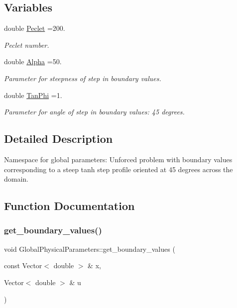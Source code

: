 \subsection*{Variables}
\begin{DoxyCompactItemize}
\item 
double \hyperlink{namespaceGlobalPhysicalParameters_ab7011a8f93f2cbd3d45af00151aee3b2}{Peclet} =200.
\begin{DoxyCompactList}\small\item\em Peclet number. \end{DoxyCompactList}\item 
double \hyperlink{namespaceGlobalPhysicalParameters_aec7a344b74b10d835b331ef0dc6601da}{Alpha} =50.
\begin{DoxyCompactList}\small\item\em Parameter for steepness of step in boundary values. \end{DoxyCompactList}\item 
double \hyperlink{namespaceGlobalPhysicalParameters_af9a5a947d725f1f088db6a6423f2f3ef}{Tan\+Phi} =1.
\begin{DoxyCompactList}\small\item\em Parameter for angle of step in boundary values\+: 45 degrees. \end{DoxyCompactList}\end{DoxyCompactItemize}


\subsection{Detailed Description}
Namespace for global parameters\+: Unforced problem with boundary values corresponding to a steep tanh step profile oriented at 45 degrees across the domain. 

\subsection{Function Documentation}
\mbox{\label{namespaceGlobalPhysicalParameters_a6e1db5726436a705e9d400fedf914cef}} 
\subsubsection{\texorpdfstring{get\+\_\+boundary\+\_\+values()}{get\_boundary\_values()}}
{\footnotesize\ttfamily void Global\+Physical\+Parameters\+::get\+\_\+boundary\+\_\+values (\begin{DoxyParamCaption}\item[{const Vector$<$ double $>$ \&}]{x,  }\item[{Vector$<$ double $>$ \&}]{u }\end{DoxyParamCaption})}



